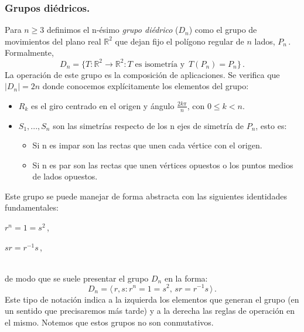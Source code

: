 \subsubsection{Grupos diédricos.}

Para $n \ge 3$ definimos el n-ésimo \textit{grupo diédrico} ($D_n$) como el grupo de movimientos del plano real $\mathbb{R}^2$ que dejan fijo el polígono regular de $n$ lados, $P_n$\,. Formalmente, \begin{equation*}
  D_n = \{T:\mathbb{R}^2 \to \mathbb{R}^2 : T \text{ es isometría y } \,  T(P_n) = P_n\}\,.
\end{equation*} La operación de este grupo es la composición de aplicaciones. Se verifica que $|D_n| = 2n$ donde conocemos explícitamente los elementos del grupo:
\begin{itemize}
  \item $R_k$ es el giro centrado en el origen y ángulo $\frac{2k\pi}{n}$, con $0 \le k < n$.
  \item $S_1,...,S_n$ son las simetrías respecto de los n ejes de simetría de $P_n$, esto es: \begin{itemize}
    \item Si n es impar son las rectas que unen cada vértice con el origen.
    \item Si n es par son las rectas que unen vértices opuestos o los puntos medios de lados opuestos.
  \end{itemize}
\end{itemize}
  
Este grupo se puede manejar de forma abstracta con las siguientes identidades fundamentales:

\begin{itemize*}[label=,itemjoin=\hspace{2em},before=\hspace{\zadlen}]
  \item $r^n = 1 = s^2$\,,
  \item $sr = r^{-1}s$\,,
\end{itemize*}\\
de modo que se suele presentar el grupo $D_n$ en la forma: \begin{equation*}
  D_n = \langle\, r,s : r^n = 1 = s^2,\,sr = r^{-1}s\,\rangle\,.

\end{equation*} Este tipo de notación indica a la izquierda los elementos que generan el grupo (en un sentido que precisaremos más tarde) y a la derecha las reglas de operación en el mismo. Notemos que estos grupos no son conmutativos.

